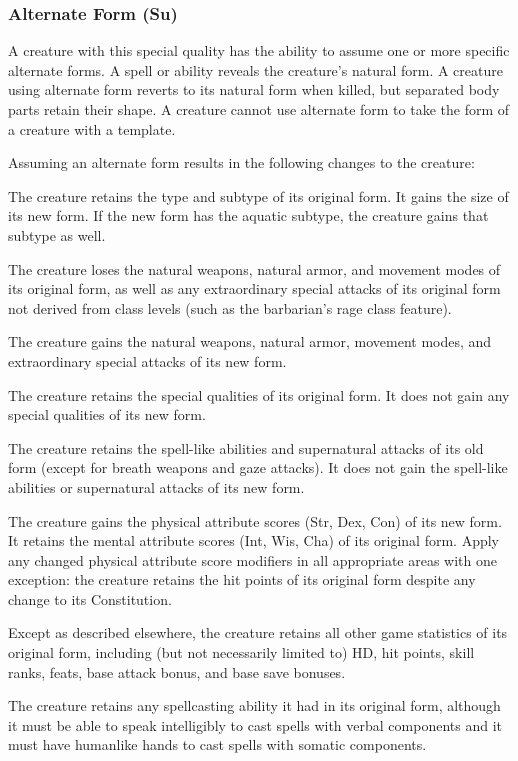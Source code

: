 {\subsubsection{Alternate Form (Su)} A creature with this special quality has the ability to assume one or more specific alternate forms. A  spell or ability reveals the creature's natural form. A creature using alternate form reverts to its natural form when killed, but separated body parts retain their shape. A creature cannot use alternate form to take the form of a creature with a template. 

Assuming an alternate form results in the following changes to the creature:
\begin{itemize*}
\item The creature retains the type and subtype of its original form. It gains the size of its new form. If the new form has the aquatic subtype, the creature gains that subtype as well.
\item The creature loses the natural weapons, natural armor, and movement modes of its original form, as well as any extraordinary special attacks of its original form not derived from class levels (such as the barbarian's rage class feature). 
\item The creature gains the natural weapons, natural armor, movement modes, and extraordinary special attacks of its new form.
\item The creature retains the special qualities of its original form. It does not gain any special qualities of its new form.
\item The creature retains the spell-like abilities and supernatural attacks of its old form (except for breath weapons and gaze attacks). It does not gain the spell-like abilities or supernatural attacks of its new form.
\item The creature gains the physical attribute scores (Str, Dex, Con) of its new form. It retains the mental attribute scores (Int, Wis, Cha) of its original form. Apply any changed physical attribute score modifiers in all appropriate areas with one exception: the creature retains the hit points of its original form despite any change to its Constitution.
\item Except as described elsewhere, the creature retains all other game statistics of its original form, including (but not necessarily limited to) HD, hit points, skill ranks, feats, base attack bonus, and base save bonuses. 
\item The creature retains any spellcasting ability it had in its original form, although it must be able to speak intelligibly to cast spells with verbal components and it must have humanlike hands to cast spells with somatic components.

\end{itemize*}}

